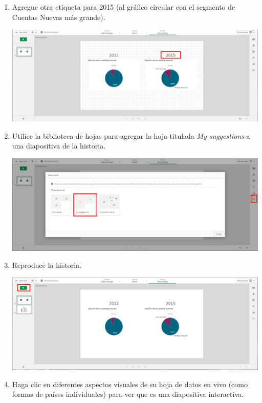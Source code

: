 \documentclass[12pt,letterpaper]{article}
\newcommand\tab[1][1cm]{\hspace*{#1}}
\begin{document}
\begin{enumerate}[\tab 1.]
\begin{center}
        \end{center}
        \item Agregue otra etiqueta para 2015 (al gráfico circular con el segmento de Cuentas Nuevas más grande).
        \begin{center}
            \includegraphics[width=13cm]{./img/img46.png}
        \end{center}
        \item Utilice la biblioteca de hojas para agregar la hoja titulada \textit{My suggestions} a una diapositiva de la historia.
        \begin{center}
            \includegraphics[width=13cm]{./img/img47.png}
        \end{center}
        \item Reproduce la historia.
        \begin{center}
            \includegraphics[width=13cm]{./img/img48.png}
        \end{center}
        \item Haga clic en diferentes aspectos visuales de su hoja de datos en vivo (como formas de países individuales) para ver que es una diapositiva interactiva.

\end{enumerate}
\end{document}
